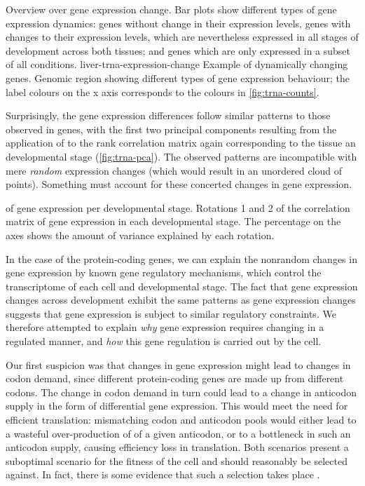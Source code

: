     {Overview over \trna gene expression change.}
    {Bar plots show different types of \trna gene expression dynamics: \trna
    genes without change in their expression levels, \trna genes with changes to
    their expression levels, which are nevertheless expressed in all stages of
    development across both tissues; and \trna genes which are only expressed in
    a subset of all conditions.}
    {liver-trna-expression-change}
    {Example of dynamically changing \trna genes.}
    {Genomic region showing different types of \trna gene expression behaviour;
    the label colours on the x axis corresponds to the colours in
    \cref{fig:trna-counts}.}

Surprisingly, the \trna gene expression differences follow similar patterns to
those observed in \mrna genes, with the first two principal components resulting
from the application of \pca to the rank correlation matrix again corresponding
to the tissue an developmental stage (\cref{fig:trna-pca}). The observed
patterns are incompatible with mere \emph{random} expression changes (which
would result in an unordered cloud of points). Something must account for these
concerted changes in \trna gene expression.

    {\pca of \trna gene expression per developmental stage.}
    {Rotations \num{1} and \num{2} of the correlation matrix of
    \trna gene expression in each developmental stage. The percentage on the
    axes shows the amount of variance explained by each rotation.}

In the case of the protein-coding genes, we can explain the nonrandom changes in
gene expression by known gene regulatory mechanisms, which control the
transcriptome of each cell and developmental stage. The fact that \trna gene
expression changes across development exhibit the same patterns as \mrna gene
expression changes suggests that \trna gene expression is subject to similar
regulatory constraints. We therefore attempted to explain \emph{why} \trna gene
expression requires changing in a regulated manner, and \emph{how} this \trna
gene regulation is carried out by the cell.

Our first suspicion was that changes in \mrna gene expression might lead to
changes in codon demand, since different protein-coding genes are made up from
different codons. The change in codon demand in turn could lead to a change in
anticodon supply in the form of differential \trna gene expression. This would
meet the need for efficient translation: mismatching codon and anticodon pools
would either lead to a wasteful over-production of \trna[s] of a given
anticodon, or to a bottleneck in such an anticodon supply, causing efficiency
loss in translation. Both scenarios present a suboptimal scenario for the
fitness of the cell and should reasonably be selected against. In fact, there is
some evidence that such a selection takes place
\citep{Ikemura:1981,Ikemura:1985,Yang:2008}.

